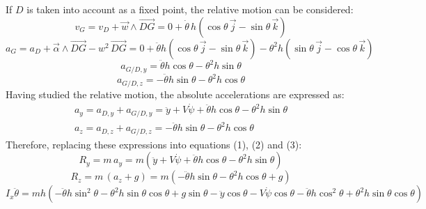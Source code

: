 \newpage
If $D$ is taken into account as a fixed point, the relative motion can be considered:
\[v_{G}=v_{D}+\vec{w} \wedge \vec{DG}=0 + \dot{\theta}\,h(\cos {\theta}\,\vec{j}-\sin {\theta}\,\vec{k})\]
\[a_{G}=a_{D}+\vec{\alpha}\wedge\vec{DG}-w^2\,\vec{DG}=0 + \ddot{\theta}h(\cos {\theta}\,\vec{j}-\sin {\theta}\,\vec{k})-\theta^2 h (\sin {\theta}\,\vec{j}-\cos {\theta}\,\vec{k})\]
\[a_{G/D,y}=\ddot{\theta}h \cos {\theta} - \theta^2 h \sin \theta\]
\[a_{G/D,z}=-\ddot{\theta}h \sin {\theta} - \theta^2 h \cos \theta\]
Having studied the relative motion, the absolute accelerations are expressed as:
\begin{eqnarray}
a_{y}=a_{D,y}+a_{G/D,y}=\ddot{y}+V \dot{\psi}+\ddot{\theta}h \cos {\theta} - \theta^2 h \sin \theta \\
a_{z}=a_{D,z}+a_{G/D,z}=-\ddot{\theta}h \sin {\theta} - \theta^2 h \cos \theta
\end{eqnarray}
Therefore, replacing these expressions into equations (1), (2) and (3):
\[R_{y}=m\,a_{y}=m(\ddot{y}+V \dot{\psi}+\ddot{\theta}h \cos {\theta} - \theta^2 h \sin \theta)\]
\[R_{z}=m\,(a_{z}+g)=m(-\ddot{\theta}h \sin {\theta} - \theta^2 h \cos \theta + g)\]
\[I_{x} \ddot{\theta}=mh(-\ddot{\theta}h \sin^2 {\theta} - \theta^2 h \sin \theta \cos \theta + g \sin \theta -\ddot{y}\cos \theta-V \dot{\psi}\cos \theta-\ddot{\theta}h \cos^2 {\theta} + \theta^2 h \sin \theta \cos \theta)\]

